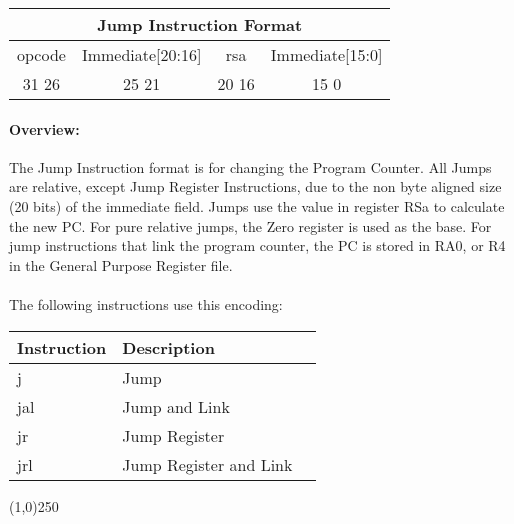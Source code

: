 \documentclass[letterpaper, 11pt]{article}
\begin{document}
\begin{center}
		\begin{tabular}{|c|c|c|c|}
				\multicolumn{4}{c}{Jump Instruction Format}\\ \hline
				\hspace{2pt} opcode \hspace{2pt}  & \hspace{3pt} Immediate[20:16] \hspace{3pt} &  \hspace{4pt} rsa \hspace{4pt} & \hspace{10pt} Immediate[15:0]  \hspace{10pt}   \\	\hline
							31 \hfill 26& 25  \hfill 21 &20 \hfill  16& 15 \hfill   0\\ \hline
		
	\end{tabular}
\end{center}	
\paragraph{Overview:} The Jump Instruction format is for changing the Program Counter. 
All Jumps are relative, except Jump Register Instructions,
due to the non byte aligned size (20 bits) of the immediate field. Jumps use the value in register RSa to calculate
the new PC. For pure relative jumps, the Zero register is used as the base. For jump instructions that link the program counter, 
the PC is stored in RA0, or R4 in the General Purpose Register file.
\paragraph{}The following instructions use this encoding: \\
\begin{center}
	\begin{tabular}{|l|l|l|} \hline
			Instruction & Description 				\\ \hline
			j			& Jump						\\ \hline
			jal			& Jump and Link				\\ \hline
			jr			& Jump Register				\\ \hline
			jrl			& Jump Register and Link	\\ \hline


\end{tabular}
\end{center}
\begin{center}
	\line(1,0){250}
\end{center}
\end{document}

